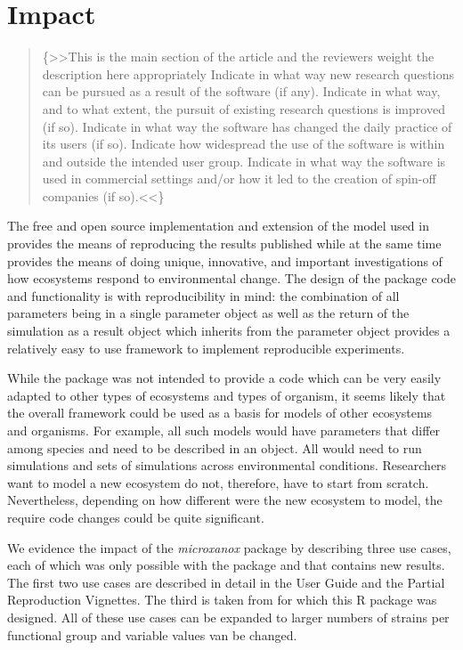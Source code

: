\documentclass[]{elsarticle} %
\begin{document}
\hypertarget{impact}{%
\section{Impact}\label{impact}}

\begin{quote}
\{\textgreater\textgreater This is the main section of the article and
the reviewers weight the description here appropriately Indicate in what
way new research questions can be pursued as a result of the software
(if any). Indicate in what way, and to what extent, the pursuit of
existing research questions is improved (if so). Indicate in what way
the software has changed the daily practice of its users (if so).
Indicate how widespread the use of the software is within and outside
the intended user group. Indicate in what way the software is used in
commercial settings and/or how it led to the creation of spin-off
companies (if so).\textless\textless\}
\end{quote}

The free and open source implementation and extension of the model used
in \citet{Bush2017} provides the means of reproducing the results
published while at the same time provides the means of doing unique,
innovative, and important investigations of how ecosystems respond to
environmental change. The design of the package code and functionality
is with reproducibility in mind: the combination of all parameters being
in a single parameter object as well as the return of the simulation as
a result object which inherits from the parameter object provides a
relatively easy to use framework to implement reproducible experiments.

While the package was not intended to provide a code which can be very
easily adapted to other types of ecosystems and types of organism, it
seems likely that the overall framework could be used as a basis for
models of other ecosystems and organisms. For example, all such models
would have parameters that differ among species and need to be described
in an object. All would need to run simulations and sets of simulations
across environmental conditions. Researchers want to model a new
ecosystem do not, therefore, have to start from scratch. Nevertheless,
depending on how different were the new ecosystem to model, the require
code changes could be quite significant.

We evidence the impact of the \emph{microxanox} package by describing
three use cases, each of which was only possible with the package and
that contains new results. The first two use cases are described in
detail in the User Guide and the Partial Reproduction Vignettes. The
third is taken from \citet{REF_NEEDED} for which this R package was
designed. All of these use cases can be expanded to larger numbers of
strains per functional group and variable values van be changed.
\end{document}
